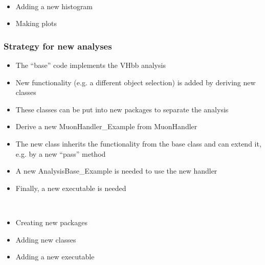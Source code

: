\documentclass{beamer}
\begin{document}
\begin{frame}
\begin{center}
\\
\vspace{5mm}
\begin{minipage}{0.5\textwidth}
\begin{itemize}
 \item Adding a new histogram
 \item Making plots
\end{itemize}
\end{minipage}
\end{center}
\end{frame}

\begin{frame}
\begin{center}
\end{center}
\end{frame}

\begin{frame}
\frametitle{Strategy for new analyses}
\begin{itemize}
 \item The ``base'' code implements the VHbb analysis
 \item New functionality (e.g. a different object selection) is added by deriving new classes
 \item These classes can be put into new packages to separate the analysis
\end{itemize}
\begin{itemize}
 \item Derive a new MuonHandler\_Example from MuonHandler
 \item The new class inherits the functionality from the base class and can extend it,\\
 e.g. by a new ``pass'' method
 \item A new AnalysisBase\_Example is needed to use the new handler
 \item Finally, a new executable is needed
\end{itemize}
\end{frame}


\begin{frame}
\begin{center}
\\
\vspace{5mm}
\begin{minipage}{0.5\textwidth}
\begin{itemize}
 \item Creating new packages
 \item Adding new classes
 \item Adding a new executable
\end{itemize}
\end{minipage}
\end{center}
\end{frame}
\end{document}
